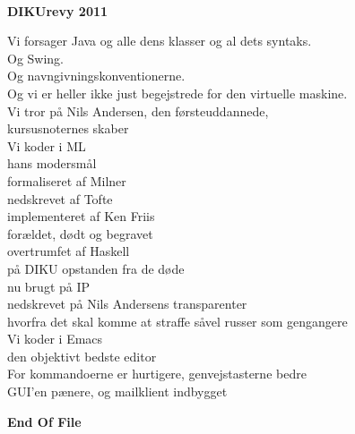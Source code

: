\newpage

\begin{center}
\\
\vspace{0.5cm}
\noindent \textbf{DIKUrevy 2011}\\
\vspace{1cm}

\begin{minipage}{0.55\textwidth}
\begin{flushleft}
\noindent Vi forsager Java og alle dens klasser og al dets syntaks.\\
Og Swing.\\
Og navngivningskonventionerne.\\
Og vi er heller ikke just begejstrede for den virtuelle maskine.\\
\vspace{0.4cm}
\noindent Vi tror på Nils Andersen, den førsteuddannede,\\
kursusnoternes skaber\\
\vspace{0.4cm}
\noindent Vi koder i ML\\
hans modersmål\\
formaliseret af Milner\\
nedskrevet af Tofte\\
implementeret af Ken Friis\\
forældet, dødt og begravet\\
overtrumfet af Haskell\\
på DIKU opstanden fra de døde\\
nu brugt på IP\\
nedskrevet på Nils Andersens transparenter\\
hvorfra det skal komme at straffe såvel russer som gengangere\\
\vspace{0.4cm}
\noindent Vi koder i Emacs\\
den objektivt bedste editor\\
For kommandoerne er hurtigere, genvejstasterne bedre\\
GUI'en pænere, og mailklient indbygget\\
\end{flushleft}
\end{minipage}
\vspace{1cm}

\noindent \textbf{End Of File}\\
\end{center}



